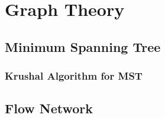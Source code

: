\newpage
\section{Graph Theory}
\subsection{Minimum Spanning Tree}
\subsubsection{Krushal Algorithm for MST}


\subsection{Flow Network}



